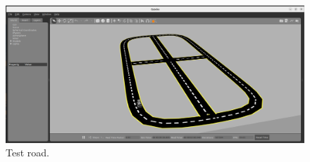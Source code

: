 \begin{figure}[ht]
  \centering
  \includegraphics[width=\textwidth]{images/road.png}
  \caption{Test road.}

\end{figure}



















